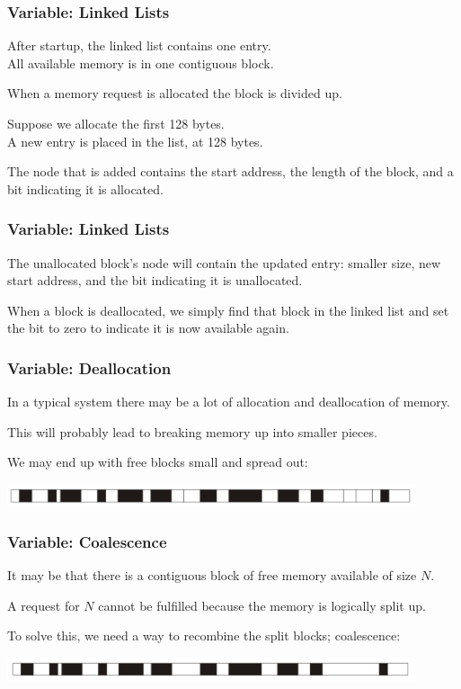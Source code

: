 \begin{frame}
\frametitle{Variable: Linked Lists}

After startup, the linked list contains one entry.\\
\quad  All available memory is in one contiguous block. 

When a memory request is allocated the block is divided up. 

Suppose we allocate the first 128 bytes.\\
\quad A new entry is placed in the list, at 128 bytes. 

The node that is added contains the start address, the length of the block, and a bit indicating it is allocated. 

\end{frame}

\begin{frame}
\frametitle{Variable: Linked Lists}

The unallocated block's node will contain the updated entry: smaller size, new start address, and the bit indicating it is unallocated. 

When a block is deallocated, we simply find that block in the linked list and set the bit to zero to indicate it is now available again.

\end{frame}

\begin{frame}
\frametitle{Variable: Deallocation}

In a typical system there may be a lot of allocation and deallocation of memory. 

This will probably lead to breaking memory up into smaller pieces.

We may end up with free blocks small and spread out:
\begin{center}
\includegraphics[width=0.9\textwidth]{images/checkerboard.png}
\end{center}



\end{frame}

\begin{frame}
\frametitle{Variable: Coalescence}

It may be that there is a contiguous block of free memory available of size $N$. 

A request for $N$ cannot be fulfilled because the memory is logically split up. 

To solve this, we need a way to recombine the split blocks; \alert{coalescence}:

\begin{center}
\includegraphics[width=0.9\textwidth]{images/checkerboard-coalesced.png}
\end{center}


\end{frame}

